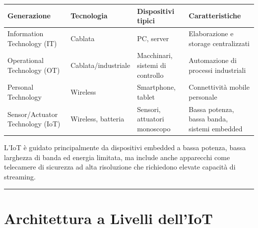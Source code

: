 \documentclass[
  italian,
  openany]{book}
\newcounter{none} %
\begin{document}
{\def\LTcaptype{none} %
\begin{longtable}[]{@{}
  >{\raggedright\arraybackslash}p{}
  >{\raggedright\arraybackslash}p{}
  >{\raggedright\arraybackslash}p{}
  >{\raggedright\arraybackslash}p{}@{}}
\toprule\noalign{}
\begin{minipage}[b]{\linewidth}\raggedright
Generazione
\end{minipage} & \begin{minipage}[b]{\linewidth}\raggedright
Tecnologia
\end{minipage} & \begin{minipage}[b]{\linewidth}\raggedright
Dispositivi tipici
\end{minipage} & \begin{minipage}[b]{\linewidth}\raggedright
Caratteristiche
\end{minipage} \\
\midrule\noalign{}
\endhead
\bottomrule\noalign{}
\endlastfoot
Information Technology (IT) & Cablata & PC, server & Elaborazione e
storage centralizzati \\
Operational Technology (OT) & Cablata/industriale & Macchinari, sistemi
di controllo & Automazione di processi industriali \\
Personal Technology & Wireless & Smartphone, tablet & Connettività
mobile personale \\
Sensor/Actuator Technology (IoT) & Wireless, batteria & Sensori,
attuatori monoscopo & Bassa potenza, bassa banda, sistemi embedded \\
\end{longtable}
}

L'IoT è guidato principalmente da dispositivi embedded a bassa potenza,
bassa larghezza di banda ed energia limitata, ma include anche
apparecchi come telecamere di sicurezza ad alta risoluzione che
richiedono elevate capacità di streaming.

\begin{center}\rule{0.5\linewidth}{0.5pt}\end{center}

\section{Architettura a Livelli
dell'IoT}\label{architettura-a-livelli-delliot}
\end{document}
